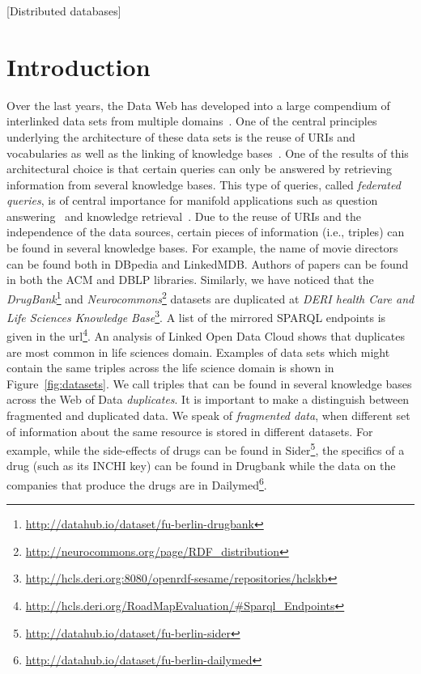 \documentclass{sig-alternate}  %
\begin{document}
[Distributed databases]



\section{Introduction}
Over the last years, the Data Web has developed into a large compendium of interlinked data sets from multiple domains~\cite{AUE+11}. 
One of the central principles underlying the architecture of these data sets is the reuse of URIs and vocabularies as well as the linking of knowledge bases~\cite{key-20}.
One of the results of this architectural choice is that certain queries can only be answered by retrieving information from several knowledge bases.
This type of queries, called \emph{federated queries}, is of central importance for manifold applications such as question answering~\cite{UNG+12} and knowledge retrieval~\cite{SHE+11}.
Due to the reuse of URIs and the independence of the data sources, certain pieces of information (i.e., triples) can be found in several knowledge bases. 
For example, the name of movie directors can be found both in DBpedia and LinkedMDB.
Authors of papers can be found in both the ACM and DBLP libraries. 
Similarly, we have noticed that the \emph{DrugBank}\footnote{\url{http://datahub.io/dataset/fu-berlin-drugbank}} and \emph{Neurocommons}\footnote{\url{http://neurocommons.org/page/RDF_distribution}} datasets are duplicated at \emph{DERI health Care and Life Sciences Knowledge Base}\footnote{\url{http://hcls.deri.org:8080/openrdf-sesame/repositories/hclskb}}. A list of the mirrored SPARQL endpoints is given in the url\footnote{\url{http://hcls.deri.org/RoadMapEvaluation/\#Sparql_Endpoints}}. 
An analysis of Linked Open Data Cloud shows that duplicates are most common in life sciences domain. 
Examples of data sets which might contain the same triples across the life science domain is shown in Figure~\ref{fig:datasets}. 
We call triples that can be found in several knowledge bases across the Web of Data \emph{duplicates}. It is important to make a distinguish between fragmented and duplicated data. 
We speak of \emph{fragmented data}, when different set of information about the same resource is stored in different datasets. 
For example, while the side-effects of drugs can be found in Sider\footnote{\url{http://datahub.io/dataset/fu-berlin-sider}}, the specifics of a drug (such as its INCHI key) can be found in Drugbank while the data on the companies that produce the drugs are in Dailymed\footnote{\url{http://datahub.io/dataset/fu-berlin-dailymed}}. 
\end{document}

